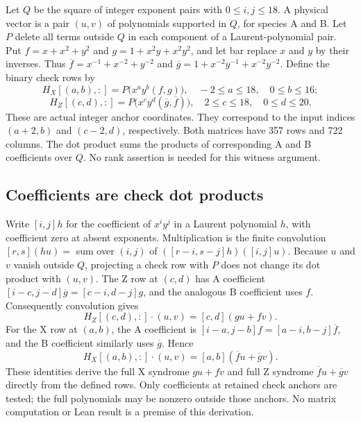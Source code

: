 \documentclass{article}
\begin{document}
Let \(Q\) be the square of integer exponent pairs with \(0 \le i,j \le 18\). A physical vector is
a pair \((u,v)\) of polynomials supported in \(Q\), for species A and B. Let \(P\) delete all
terms outside \(Q\) in each component of a Laurent-polynomial pair. Put \(f = x + x^2 + y^2\) and
\(g = 1 + x^2 y + x^2 y^2\), and let bar replace \(x\) and \(y\) by their inverses. Thus
\(\overline{f} = x^{-1} + x^{-2} + y^{-2}\) and \(\overline{g} = 1 + x^{-2} y^{-1} + x^{-2}
y^{-2}\). Define the binary check rows by
\begin{equation}
  H_X[(a,b), {:}] = P\bigl(x^a y^b (f, g)\bigr), \quad -2 \le a \le 18, \quad 0 \le b \le 16;
\end{equation}
\begin{equation}
  H_Z[(c,d), {:}] = P\bigl(x^c y^d (\overline{g}, \overline{f})\bigr),
  \quad 2 \le c \le 18, \quad 0 \le d \le 20.
\end{equation}
These are actual integer anchor coordinates. They correspond to the input indices \((a+2,b)\) and
\((c-2,d)\), respectively. Both matrices have 357 rows and 722 columns. The dot product sums the
products of corresponding A and B coefficients over \(Q\). No rank assertion is needed for this
witness argument.

\subsection{Coefficients are check dot products}\label{sec:witness-coefficients}

Write \([i,j]h\) for the coefficient of \(x^i y^j\) in a Laurent polynomial \(h\), with
coefficient zero at absent exponents. Multiplication is the finite convolution
\([r,s](hu) =\) sum over \((i,j)\) of \(([r-i,s-j]h)([i,j]u)\). Because \(u\) and \(v\) vanish
outside \(Q\), projecting a check row with \(P\) does not change its dot product with \((u,v)\).
The Z row at \((c,d)\) has A coefficient \([i-c,j-d]\overline{g} = [c-i,d-j]g\), and the
analogous B coefficient uses \(f\). Consequently convolution gives
\begin{equation}
  H_Z[(c,d), {:}] \cdot (u,v) = [c,d](gu + fv).
\end{equation}
For the X row at \((a,b)\), the A coefficient is \([i-a,j-b]f = [a-i,b-j]\overline{f}\), and the
B coefficient similarly uses \(\overline{g}\). Hence
\begin{equation}
  H_X[(a,b), {:}] \cdot (u,v) = [a,b](\overline{f} u + \overline{g} v).
\end{equation}
These identities derive the full X syndrome \(gu + fv\) and full Z syndrome
\(\overline{f} u + \overline{g} v\) directly from the defined rows. Only coefficients at retained
check anchors are tested; the full polynomials may be nonzero outside those anchors. No matrix
computation or Lean result is a premise of this derivation.
\end{document}
